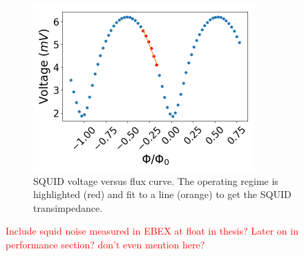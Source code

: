 \begin{figure}[ht!]
\begin{center}
\includegraphics[height=2.5in]{figures/vphi_physical.png}
\caption{\ac{SQUID} voltage versus flux curve. The operating regime is highlighted (red) and fit to a line (orange) to get the \ac{SQUID} transimpedance.
\label{fig:squid_transimpedance} }
\end{center}
\end{figure}



\textcolor{red}{Include squid noise measured in EBEX at float in thesis? Later on in performance section? don't even mention here?}

